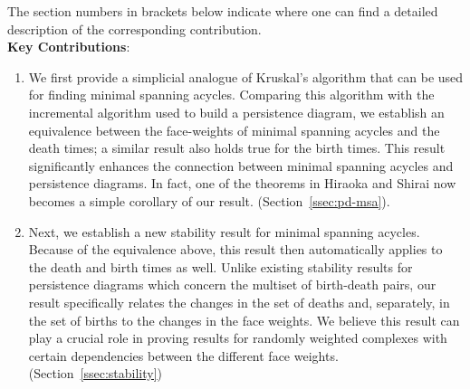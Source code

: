 \documentclass[12pt]{amsart}
\newcommand{\dy}[1]{\textcolor{magenta}{#1}}
\newcommand{\gt}[1]{\textcolor{blue}{#1}}
\renewcommand{\dy}[1]{#1}
\renewcommand{\gt}[1]{#1}
\numberwithin{equation}{section}
\numberwithin{theorem}{section}
\newcommand{\1}{\mathbf{1}}
\begin{document}
The section numbers in brackets below indicate where one can find a detailed description of the corresponding contribution.\\



\noindent \textbf{Key Contributions}: \begin{enumerate}
%
%
\item  \gt{We first provide a \dy{simplicial analogue} of Kruskal's algorithm that can be used for finding minimal spanning acycles. Comparing this  algorithm with the incremental algorithm used to build a  persistence diagram, we establish an equivalence between the face-weights of minimal spanning acycles and the death times; a similar result also holds true for the birth times. This result significantly enhances the connection between minimal spanning acycles and persistence diagrams. In fact, one of the theorems in Hiraoka and Shirai \cite[Theorem 1.1]{hiraoka2015minimum} now becomes a simple corollary of our result. (Section~\ref{ssec:pd-msa}).} %

\item \gt{Next, we establish a new stability result for minimal spanning acycles. Because of the equivalence above, this result then automatically applies to the death and birth times as well. Unlike existing stability results for persistence diagrams which concern the multiset of birth-death pairs, our result specifically relates the changes in the set of deaths and, separately, in the set of births to the changes in the face weights. We believe this result can play a crucial role in proving results for randomly weighted complexes with certain dependencies between the different face weights. (Section~\ref{ssec:stability})} %


\end{enumerate}
\end{document}
